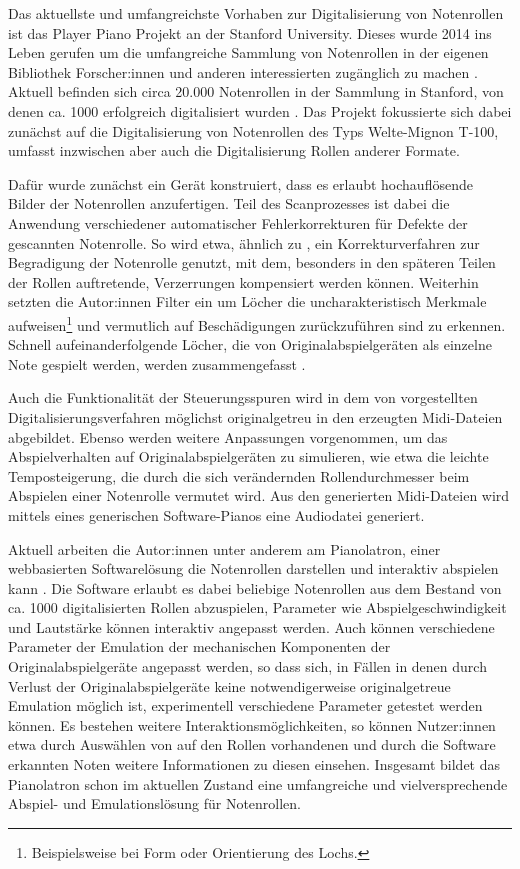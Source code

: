 Das aktuellste und umfangreichste Vorhaben zur Digitalisierung von Notenrollen ist das Player Piano Projekt an der Stanford University.
Dieses wurde 2014 ins Leben gerufen um die umfangreiche Sammlung von Notenrollen in der eigenen Bibliothek Forscher:innen und anderen interessierten zugänglich zu machen \autocite[]{shi_2019}.
Aktuell befinden sich circa 20.000 Notenrollen in der Sammlung in Stanford, von denen ca. 1000 erfolgreich digitalisiert wurden \autocite[]{broadwell_2022}.
Das Projekt fokussierte sich dabei zunächst auf die Digitalisierung von Notenrollen des Typs Welte-Mignon T-100, umfasst inzwischen aber auch die Digitalisierung Rollen anderer Formate.

Dafür wurde zunächst ein Gerät konstruiert, dass es erlaubt hochauflösende Bilder der Notenrollen anzufertigen.
Teil des Scanprozesses ist dabei die Anwendung verschiedener automatischer Fehlerkorrekturen für Defekte der gescannten Notenrolle.
So wird etwa, ähnlich zu \textcite[]{zoltan_1994}, ein Korrekturverfahren zur Begradigung der Notenrolle genutzt, mit dem, besonders in den späteren Teilen der Rollen auftretende, Verzerrungen kompensiert werden können.
Weiterhin setzten die Autor:innen Filter ein um Löcher die uncharakteristisch Merkmale aufweisen\footnote{Beispielsweise bei Form oder Orientierung des Lochs.} und vermutlich auf Beschädigungen zurückzuführen sind zu erkennen.
Schnell aufeinanderfolgende Löcher, die von Originalabspielgeräten als einzelne Note gespielt werden, werden zusammengefasst \parencite[519-520]{shi_2019}.

Auch die Funktionalität der Steuerungsspuren wird in dem von \textcite[521-522]{shi_2019} vorgestellten Digitalisierungsverfahren möglichst originalgetreu in den erzeugten Midi-Dateien abgebildet.
Ebenso werden weitere Anpassungen vorgenommen, um das Abspielverhalten auf Originalabspielgeräten zu simulieren, wie etwa die leichte Temposteigerung, die durch die sich verändernden Rollendurchmesser beim Abspielen einer Notenrolle vermutet wird.
Aus den generierten Midi-Dateien wird mittels eines generischen Software-Pianos eine Audiodatei generiert.

Aktuell arbeiten die Autor:innen unter anderem am Pianolatron, einer webbasierten Softwarelösung die Notenrollen darstellen und interaktiv abspielen kann \parencite[]{vijoy_2022}.
Die Software erlaubt es dabei beliebige Notenrollen aus dem Bestand von ca. 1000 digitalisierten Rollen abzuspielen, Parameter wie Abspielgeschwindigkeit und Lautstärke können interaktiv angepasst werden.
Auch können verschiedene Parameter der Emulation der mechanischen Komponenten der Originalabspielgeräte angepasst werden, so dass sich, in Fällen in denen durch Verlust der Originalabspielgeräte keine notwendigerweise originalgetreue Emulation möglich ist, experimentell verschiedene Parameter getestet werden können.
Es bestehen weitere Interaktionsmöglichkeiten, so können Nutzer:innen etwa durch Auswählen von auf den Rollen vorhandenen und durch die Software erkannten Noten weitere Informationen zu diesen einsehen.
Insgesamt bildet das Pianolatron schon im aktuellen Zustand eine umfangreiche und vielversprechende Abspiel- und Emulationslösung für Notenrollen.

